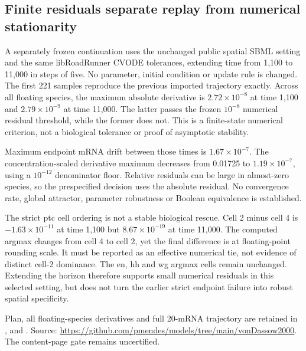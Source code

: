 \subsection{Finite residuals separate replay from numerical stationarity}
A separately frozen continuation uses the unchanged public spatial SBML setting and the same libRoadRunner CVODE tolerances, extending time from 1,100 to 11,000 in steps of five. No parameter, initial condition or update rule is changed. The first 221 samples reproduce the previous imported trajectory exactly. Across all floating species, the maximum absolute derivative is $2.72\times10^{-8}$ at time 1,100 and $2.79\times10^{-9}$ at time 11,000. The latter passes the frozen $10^{-8}$ numerical residual threshold, while the former does not. This is a finite-state numerical criterion, not a biological tolerance or proof of asymptotic stability.

Maximum endpoint mRNA drift between those times is $1.67\times10^{-7}$. The concentration-scaled derivative maximum decreases from 0.01725 to $1.19\times10^{-7}$, using a $10^{-12}$ denominator floor. Relative residuals can be large in almost-zero species, so the prespecified decision uses the absolute residual. No convergence rate, global attractor, parameter robustness or Boolean equivalence is established.

The strict ptc cell ordering is not a stable biological rescue. Cell 2 minus cell 4 is $-1.63\times10^{-11}$ at time 1,100 but $8.67\times10^{-19}$ at time 11,000. The computed argmax changes from cell 4 to cell 2, yet the final difference is at floating-point rounding scale. It must be reported as an effective numerical tie, not evidence of distinct cell-2 dominance. The en, hh and wg argmax cells remain unchanged. Extending the horizon therefore supports small numerical residuals in this selected setting, but does not turn the earlier strict endpoint failure into robust spatial specificity.

Plan, all floating-species derivatives and full 20-mRNA trajectory are retained in ,  and . Source: \url{https://github.com/pmendes/models/tree/main/vonDassow2000}. The content-page gate remains uncertified.
